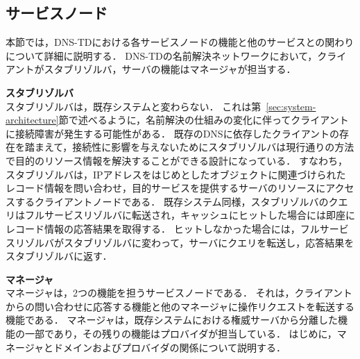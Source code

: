 \subsection{サービスノード}
本節では，DNS-TDにおける各サービスノードの機能と他のサービスとの関わりについて詳細に説明する．
DNS-TDの名前解決ネットワークにおいて，クライアントがスタブリゾルバ，サーバの機能はマネージャが担当する．\newline

\hspace{-12pt}\textbf{スタブリゾルバ}\\
\label{sec:stab-resolver}
\hspace{12pt}スタブリゾルバは，既存システムと変わらない．
これは第~\ref{sec:system-architecture}節で述べるように，名前解決の仕組みの変化に伴ってクライアントに接続障害が発生する可能性がある．
既存のDNSに依存したクライアントの存在を踏まえて，接続性に影響を与えないためにスタブリゾルバは現行通りの方法で目的のリソース情報を解決することができる設計になっている．
すなわち，スタブリゾルバは，IPアドレスをはじめとしたオブジェクトに関連づけられたレコード情報を問い合わせ，目的サービスを提供するサーバのリソースにアクセスするクライアントノードである．
既存システム同様，スタブリゾルバのクエリはフルサービスリゾルバに転送され，キャッシュにヒットした場合には即座にレコード情報の応答結果を取得する．
ヒットしなかった場合には，フルサービスリゾルバがスタブリゾルバに変わって，サーバにクエリを転送し，応答結果をスタブリゾルバに返す．\newline

\hspace{-12pt}\textbf{マネージャ}\\
\hspace{12pt} マネージャは，2つの機能を担うサービスノードである．
それは，クライアントからの問い合わせに応答する機能と他のマネージャに操作リクエストを転送する機能である．
マネージャは，既存システムにおける権威サーバから分離した機能の一部であり，その残りの機能はプロバイダが担当している．
はじめに，マネージャとドメインおよびプロバイダの関係について説明する．

